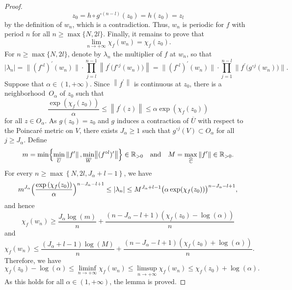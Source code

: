 \begin{proof}
\[
z_{0} = h \circ g^{\circ (n -l)}(z_{0}) = h(z_{0}) = z_{l}
\]
by the definition of $w_{n}$, which is a contradiction. Thus, $w_{n}$ is periodic for $f$ with period $n$ for all $n \geq \max\lbrace N, 2 l \rbrace$. Finally, it remains to prove that
\[
\lim_{n \to +\infty} \chi_{f}(w_{n}) = \chi_{f}(z_{0}).
\]
For $n \geq \max\lbrace N, 2 l \rbrace$, denote by $\lambda_{n}$ the multiplier of $f$ at $w_{n}$, so that
\[
\left\lvert \lambda_{n} \right\rvert = \bigl\lVert(f^{\circ l})^{\prime}(w_{n}) \bigr\rVert \cdot \prod_{j = l}^{n -1} \left\lVert f^{\prime}\bigl(f^{\circ j}(w_{n}) \bigr) \right\rVert = \bigl\lVert(f^{\circ l})^{\prime}(w_{n}) \bigr\rVert \cdot \prod_{j = 1}^{n -l} \bigl\lVert f^{\prime}\bigl(g^{\circ j}(w_{n}) \bigr) \bigr\rVert.
\]
Suppose that $\alpha \in (1, +\infty)$. Since $\left\lVert f^{\prime} \right\rVert$ is continuous at $z_{0}$, there is a neighborhood~$O_{\alpha}$ of $z_{0}$ such that
\[
\frac{\exp\left(\chi_{f}(z_{0}) \right)}{\alpha} \leq \left\lVert f^{\prime}(z) \right\rVert \leq \alpha \exp\left(\chi_{f}(z_{0}) \right)
\]
for all $z \in O_{\alpha}$. As $g(z_{0}) = z_{0}$ and $g$ induces a contraction of $\overline{U}$ with respect to the Poincaré metric on $V$, there exists $J_{\alpha} \geq 1$ such that $g^{\circ j}(V) \subset O_{\alpha}$ for all $j \geq J_{\alpha}$. Define
\[
m = \min\Bigl\lbrace \min_{\overline{U}} \left\lVert f^{\prime} \right\rVert, \min_{\overline{W}} \bigl\lVert(f^{\circ l})^{\prime} \bigr\rVert \Bigr\rbrace \in \mathbb{R}_{> 0} \quad \text{and} \quad M = \max_{\widehat{\mathbb{C}}} \left\lVert f^{\prime} \right\rVert \in \mathbb{R}_{> 0}.
\]
For every $n \geq \max\left\lbrace N, 2 l, J_{\alpha} +l -1 \right\rbrace$, we have
\[
m^{J_{\alpha}} \Bigl(\frac{\exp\left(\chi_{f}(z_{0}) \right)}{\alpha} \Bigr)^{n -J_{\alpha} -l +1} \leq \left\lvert \lambda_{n} \right\rvert \leq M^{J_{\alpha} +l -1} \bigl(\alpha \exp(\chi_{f}(z_{0})) \bigr)^{n -J_{\alpha} -l +1},
\]
and hence
\[
\chi_{f}(w_{n}) \geq \frac{J_{\alpha} \log(m)}{n} +\frac{\left(n -J_{\alpha} -l +1 \right) \left(\chi_{f}(z_{0}) -\log(\alpha) \right)}{n}
\]
and
\[
\chi_{f}(w_{n}) \leq \frac{\left(J_{\alpha} +l -1 \right) \log(M)}{n} +\frac{\left(n -J_{\alpha} -l +1 \right) \left(\chi_{f}(z_{0}) +\log(\alpha) \right)}{n}.
\]
Therefore, we have
\[
\chi_{f}(z_{0}) -\log(\alpha) \leq \liminf_{n \to +\infty} \chi_{f}(w_{n}) \leq \limsup_{n \to +\infty} \chi_{f}(w_{n}) \leq \chi_{f}(z_{0}) +\log(\alpha).
\]
As this holds for all $\alpha \in (1, +\infty)$, the lemma is proved.
\end{proof}

